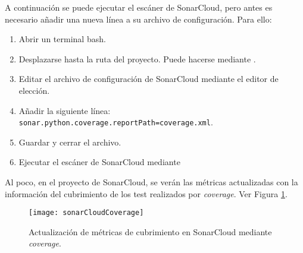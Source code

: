 A continuación se puede ejecutar el escáner de SonarCloud, pero antes es necesario añadir una nueva línea a su archivo de configuración. Para ello:
\begin{enumerate}
\item Abrir un terminal bash.
\item Desplazarse hasta la ruta del proyecto. Puede hacerse mediante .
\item Editar el archivo de configuración de SonarCloud mediante el editor de elección. 
\item Añadir la siguiente línea: \texttt{sonar.python.coverage.reportPath=coverage.xml}.
\item Guardar y cerrar el archivo.
\item Ejecutar el escáner de SonarCloud mediante\\ 
\end{enumerate}

Al poco, en el proyecto de SonarCloud, se verán las métricas actualizadas con la información del cubrimiento de los test realizados por \emph{coverage}. Ver Figura \ref{fig:sonarCloudCoverage}.

\begin{figure}[H]
	\centering
	\texttt{[image: sonarCloudCoverage]}
	\caption[Métricas de \emph{coverage} en SonarCloud]{Actualización de métricas de cubrimiento en SonarCloud mediante \emph{coverage}.}\label{fig:sonarCloudCoverage}
\end{figure}


















































































